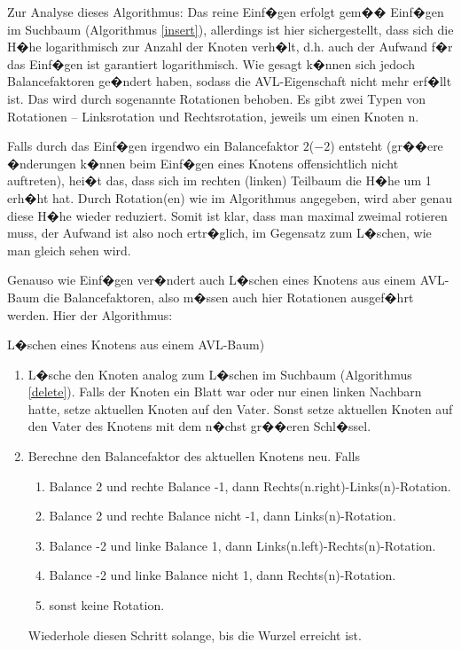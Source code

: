 Zur Analyse dieses Algorithmus: Das reine Einf�gen erfolgt gem�� Einf�gen im Suchbaum (Algorithmus \ref{insert}), allerdings ist hier sichergestellt, dass sich die H�he logarithmisch zur Anzahl der Knoten verh�lt, d.h. auch der Aufwand f�r das Einf�gen ist garantiert logarithmisch. Wie gesagt k�nnen sich jedoch Balancefaktoren ge�ndert haben, sodass die AVL-Eigenschaft nicht mehr erf�llt ist. Das wird durch sogenannte Rotationen behoben. Es gibt zwei Typen von Rotationen -- Linksrotation und Rechtsrotation, jeweils um einen Knoten n.

  \medskip
{}  \medskip

Falls durch das Einf�gen irgendwo ein Balancefaktor $2$($-2$) entsteht (gr��ere �nderungen k�nnen beim Einf�gen eines Knotens offensichtlich nicht auftreten), hei�t das, dass sich im rechten (linken) Teilbaum die H�he um 1 erh�ht hat. Durch Rotation(en) wie im Algorithmus angegeben, wird aber genau diese H�he wieder reduziert. Somit ist klar, dass man maximal zweimal rotieren muss, der Aufwand ist also noch ertr�glich, im Gegensatz zum L�schen, wie man gleich sehen wird.

Genauso wie Einf�gen ver�ndert auch L�schen eines Knotens aus einem AVL-Baum die Balancefaktoren, also m�ssen auch hier Rotationen ausgef�hrt werden. Hier der Algorithmus:

\begin{alg} \label{avldelete}
	L�schen eines Knotens aus einem AVL-Baum)
	\begin{enumerate}
		\item L�sche den Knoten analog zum L�schen im Suchbaum (Algorithmus \ref{delete}). Falls der Knoten ein Blatt war oder nur einen linken Nachbarn hatte, setze aktuellen Knoten auf den Vater. Sonst setze aktuellen Knoten auf den Vater des Knotens mit dem n�chst gr��eren Schl�ssel.
		\item Berechne den Balancefaktor des aktuellen Knotens neu. Falls
			\begin{enumerate}
				\item Balance 2 und rechte Balance -1, dann Rechts(n.right)-Links(n)-Rotation.
				\item Balance 2 und rechte Balance nicht -1, dann Links(n)-Rotation.
				\item Balance -2 und linke Balance 1, dann Links(n.left)-Rechts(n)-Rotation.
				\item Balance -2 und linke Balance nicht 1, dann Rechts(n)-Rotation.
				\item sonst keine Rotation.
			\end{enumerate}
			Wiederhole diesen Schritt solange, bis die Wurzel erreicht ist.
	\end{enumerate}
\end{alg}

